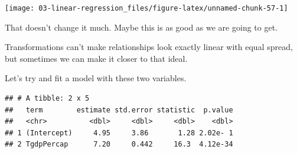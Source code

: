\documentclass[
]{book}
\newenvironment{Shaded}{\begin{snugshade}}{\end{snugshade}}
\newcommand{\DataTypeTok}[1]{\textcolor[rgb]{0.13,0.29,0.53}{#1}}
\newcommand{\DecValTok}[1]{\textcolor[rgb]{0.00,0.00,0.81}{#1}}
\newcommand{\KeywordTok}[1]{\textcolor[rgb]{0.13,0.29,0.53}{\textbf{#1}}}
\newcommand{\NormalTok}[1]{#1}
\newcommand{\OperatorTok}[1]{\textcolor[rgb]{0.81,0.36,0.00}{\textbf{#1}}}
\newcommand{\StringTok}[1]{\textcolor[rgb]{0.31,0.60,0.02}{#1}}
\begin{document}
\begin{Shaded}
\end{Shaded}

\begin{center}\texttt{[image: 03-linear-regression\_files/figure-latex/unnamed-chunk-57-1]} \end{center}

That doesn't change it much. Maybe this is as good as we are going to get.

Transformations can't make relationships look exactly linear with equal spread, but sometimes we can make it closer to that ideal.

Let's try and fit a model with these two variables.

\begin{Shaded}
\end{Shaded}

\begin{verbatim}
## # A tibble: 2 x 5
##   term        estimate std.error statistic  p.value
##   <chr>          <dbl>     <dbl>     <dbl>    <dbl>
## 1 (Intercept)     4.95     3.86       1.28 2.02e- 1
## 2 TgdpPercap      7.20     0.442     16.3  4.12e-34
\end{verbatim}
\end{document}
